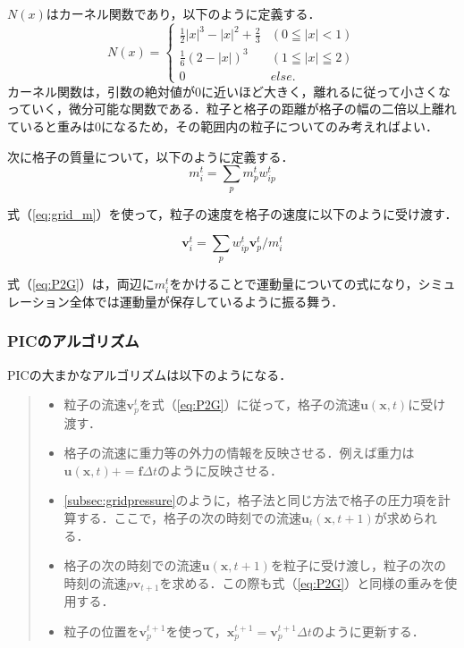 \documentclass[a4j,12pt]{jreport}
\begin{document}
$N(x)$はカーネル関数であり，以下のように定義する．
\begin{equation}\label{eq:kernel}
N(x) = 
\begin{cases}
\frac{1}{2}|x|^3 - |x|^2 + \frac{2}{3} & (0\leqq|x|<1) \\
\frac{1}{6}(2-|x|)^3 & (1\leqq|x|\leqq2) \\
0 & else.
\end{cases}
\end{equation} 
カーネル関数は，引数の絶対値が0に近いほど大きく，離れるに従って小さくなっていく，微分可能な関数である．粒子と格子の距離が格子の幅の二倍以上離れていると重みは0になるため，その範囲内の粒子についてのみ考えればよい．

次に格子の質量について，以下のように定義する．
\begin{equation}\label{eq:grid_m}
m^t_i = \sum\limits_p m^t_pw^t_{ip}
\end{equation} 

式（\ref{eq:grid_m}）を使って，粒子の速度を格子の速度に以下のように受け渡す．

\begin{equation}\label{eq:P2G}
\bm{v}^t_i = \sum\limits_p w^t_{ip}\bm{v}^t_p / m^t_i
\end{equation} 

式（\ref{eq:P2G}）は，両辺に$m^t_i$をかけることで運動量についての式になり，シミュレーション全体では運動量が保存しているように振る舞う．

\subsubsection{PICのアルゴリズム} \label{subsec:PIC_algo}
PICの大まかなアルゴリズムは以下のようになる．
\begin{quote}
	\begin{itemize}
		\item 粒子の流速$\bm{v}^{t}_p$を式（\ref{eq:P2G}）に従って，格子の流速$\bm{u}(\bm{x},t)$に受け渡す．
		\item 格子の流速に重力等の外力の情報を反映させる．例えば重力は$\bm{u}(\bm{x},t) += \bm{f}\Delta t$のように反映させる．
		\item \ref{subsec:gridpressure}のように，格子法と同じ方法で格子の圧力項を計算する．ここで，格子の次の時刻での流速$\bm{u}_t(\bm{x},t+1)$が求められる．
		\item 格子の次の時刻での流速$\bm{u}(\bm{x},t+1)$を粒子に受け渡し，粒子の次の時刻の流速$p\bm{v}_{t+1}$を求める．この際も式（\ref{eq:P2G}）と同様の重みを使用する．
		\item 粒子の位置を$\bm{v}^{t+1}_p$を使って，$\bm{x}^{t+1}_p = \bm{v}^{t+1}_p\Delta t $のように更新する．
	\end{itemize}
\end{quote}
\end{document}

